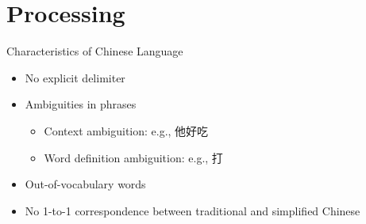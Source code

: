\documentclass[12pt, trans]{beamer}
\newcommand{\1}[1]{{\mathbf 1}\left\{#1\right\}}        %
\begin{document}

\section{Processing}

\begin{frame}{Characteristics of Chinese Language}

\begin{itemize}[<+->]
\item No explicit delimiter
\item Ambiguities in phrases
	\begin{itemize}
	\item Context ambiguition: e.g., 他好吃
	\item Word definition ambiguition: e.g., 打
	\end{itemize}
\item Out-of-vocabulary words
\item No 1-to-1 correspondence between traditional and simplified Chinese
\end{itemize}

\end{frame}
\end{document}
